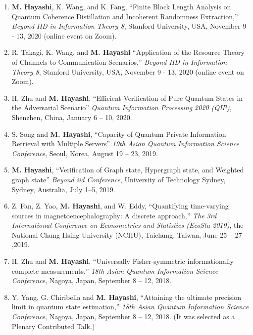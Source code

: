 \documentclass[a4paper,12pt,oneside]{article}
\begin{document}
\begin{enumerate}
\item
\textbf{M. Hayashi}, K. Wang, and K. Fang,
``Finite Block Length Analysis on Quantum Coherence Distillation and Incoherent Randomness Extraction,''
{\em Beyond IID in Information Theory 8}, Stanford University, USA, November 9 - 13, 2020 (online event on Zoom).

\item
R. Takagi, K. Wang, and \textbf{M. Hayashi} 
``Application of the Resource Theory of Channels to Communication Scenarios,''
{\em Beyond IID in Information Theory 8}, Stanford University, USA, November 9 - 13, 2020 (online event on Zoom).

\item 
H. Zhu and \textbf{M. Hayashi}, 
``Efficient Verification of Pure Quantum States in the Adversarial Scenario''
{\em Quantum Information Processing 2020 (QIP)}, 
Shenzhen, China, January 6 -- 10, 2020.


\item 
S. Song and \textbf{M. Hayashi}, 
``Capacity of Quantum
Private Information Retrieval with Multiple Servers''
{\em 19th Asian Quantum Information Science Conference},
Seoul, Korea, August 19 -- 23, 2019.

\item 
\textbf{M. Hayashi}, 
``Verification of Graph state, Hypergraph state, and Weighted graph state''
{\em Beyond iid Conference},
University of Technology Sydney, Sydney, Australia, 
July 1--5, 2019.

\item 
Z. Fan, Z. Yao, \textbf{M. Hayashi}, and W. Eddy,
``Quantifying time-varying sources in magnetoencephalography: A discrete approach,''
{\em The 3rd International Conference on Econometrics and Statistics (EcoSta 2019)},
the National Chung Hsing University (NCHU), Taichung, Taiwan, June 25 -- 27 ,2019.

\item 
H. Zhu and \textbf{M. Hayashi},
``Universally Fisher-symmetric informationally complete measurements,''
{\em 18th Asian Quantum Information Science Conference},
Nagoya, Japan, September 8 -- 12, 2018.

\item 
Y. Yang, G. Chiribella and \textbf{M. Hayashi},
``Attaining the ultimate precision limit in quantum state estimation,''
{\em 18th Asian Quantum Information Science Conference},
Nagoya, Japan, September 8 -- 12, 2018.
(It was selected as a Plenary Contributed Talk.)


\end{enumerate}
\end{document}
